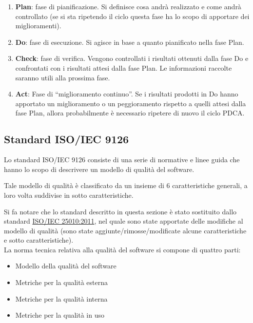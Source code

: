 			\begin{enumerate}
			
				\item \textbf{Plan}: fase di pianificazione. Si definisce cosa andrà realizzato e come andrà controllato (se si sta ripetendo il ciclo questa fase ha lo scopo di apportare dei miglioramenti).
				\item \textbf{Do}: fase di esecuzione. Si agisce in base a quanto pianificato nella fase Plan.
				\item \textbf{Check}: fase di verifica. Vengono controllati i risultati ottenuti dalla fase Do e confrontati con i risultati attesi dalla fase Plan. Le informazioni raccolte saranno utili alla prossima fase.
				\item \textbf{Act}: Fase di “miglioramento continuo”. Se i risultati prodotti in Do hanno apportato un miglioramento o un peggioramento rispetto a quelli attesi dalla fase Plan, allora probabilmente è necessario ripetere di nuovo il ciclo PDCA.
				
			\end{enumerate}

	\subsection{Standard ISO/IEC 9126}
	
		Lo standard ISO/IEC 9126 consiste di una serie di normative e linee guida che hanno lo scopo di descrivere un modello di qualità del software. 
		
		Tale modello di qualità è classificato da un insieme di 6 caratteristiche generali, a loro volta suddivise in sotto caratteristiche.
		
		Si fa notare che lo standard descritto in questa sezione è stato sostituito dallo standard \href{http://www.iso.org/iso/iso_catalogue/catalogue_tc/catalogue_detail.htm?csnumber=35733}{ISO/IEC 25010:2011}, nel quale sono state apportate delle modifiche al modello di qualità (sono state aggiunte/rimosse/modificate alcune caratteristiche e sotto caratteristiche).\\
		La norma tecnica relativa alla qualità del software si compone di quattro parti:
		\begin{itemize}
		
			\item Modello della qualità del software
			\item Metriche per la qualità esterna
			\item Metriche per la qualità interna
			\item Metriche per la qualità in uso
			
		\end{itemize}
		
